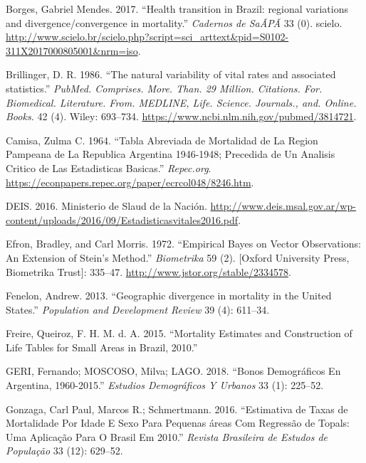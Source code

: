 \documentclass[12pt,]{article}
\begin{document}
\leavevmode\hypertarget{ref-Borges2017}{}%
Borges, Gabriel Mendes. 2017. ``Health transition in Brazil: regional
variations and divergence/convergence in mortality.'' \emph{Cadernos de
SaÃPÃ} 33 (0). scielo.
\url{http://www.scielo.br/scielo.php?script=sci_arttext\&pid=S0102-311X2017000805001\&nrm=iso}.

\leavevmode\hypertarget{ref-Brillinger1986}{}%
Brillinger, D. R. 1986. ``The natural variability of vital rates and
associated statistics.'' \emph{PubMed. Comprises. More. Than. 29
Million. Citations. For. Biomedical. Literature. From. MEDLINE, Life.
Science. Journals., and. Online. Books.} 42 (4). Wiley: 693--734.
\url{https://www.ncbi.nlm.nih.gov/pubmed/3814721}.

\leavevmode\hypertarget{ref-Camisa1964}{}%
Camisa, Zulma C. 1964. ``Tabla Abreviada de Mortalidad de La Region
Pampeana de La Republica Argentina 1946-1948; Precedida de Un Analisis
Critico de Las Estadisticas Basicas.'' \emph{Repec.org}.
\url{https://econpapers.repec.org/paper/ecrcol048/8246.htm}.

\leavevmode\hypertarget{ref-DEIS2016}{}%
DEIS. 2016. Ministerio de Slaud de la Nación.
\url{http://www.deis.msal.gov.ar/wp-content/uploads/2016/09/Estadisticasvitales2016.pdf}.

\leavevmode\hypertarget{ref-Efron1972}{}%
Efron, Bradley, and Carl Morris. 1972. ``Empirical Bayes on Vector
Observations: An Extension of Stein's Method.'' \emph{Biometrika} 59
(2). {[}Oxford University Press, Biometrika Trust{]}: 335--47.
\url{http://www.jstor.org/stable/2334578}.

\leavevmode\hypertarget{ref-Fenelon2013}{}%
Fenelon, Andrew. 2013. ``Geographic divergence in mortality in the
United States.'' \emph{Population and Development Review} 39 (4):
611--34.

\leavevmode\hypertarget{ref-FreireEtAl2015}{}%
Freire, Queiroz, F. H. M. d. A. 2015. ``Mortality Estimates and
Construction of Life Tables for Small Areas in Brazil, 2010.''

\leavevmode\hypertarget{ref-GeriMoscoso2018}{}%
GERI, Fernando; MOSCOSO, Milva; LAGO. 2018. ``Bonos Demográficos En
Argentina, 1960-2015.'' \emph{Estudios Demográficos Y Urbanos} 33 (1):
225--52.

\leavevmode\hypertarget{ref-GonzagaSchmertmann2016}{}%
Gonzaga, Carl Paul, Marcos R.; Schmertmann. 2016. ``Estimativa de Taxas
de Mortalidade Por Idade E Sexo Para Pequenas áreas Com Regressão de
Topals: Uma Aplicação Para O Brasil Em 2010.'' \emph{Revista Brasileira
de Estudos de População} 33 (12): 629--52.
\end{document}
